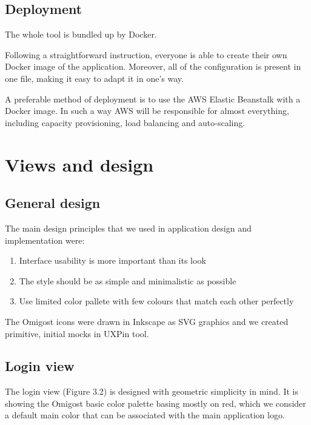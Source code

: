 \documentclass[licencjacka,en]{thesisclass}
\begin{document}
    \subsection{Deployment}

    The whole tool is bundled up by Docker.

    Following a straightforward instruction, everyone is able
    to create their own Docker image of the application.
    Moreover, all of the configuration is present in one file,
    making it easy to adapt it in one's way.

    A preferable method of deployment is to use the AWS Elastic Beanstalk with a Docker image.
    In such a way AWS will be responsible for almost everything,
    including capacity provisioning, load balancing and auto-scaling.

    \section{Views and design}
    
    \subsection{General design}
    
    The main design principles that we used in application design and implementation were:
    \begin{enumerate}
        \item Interface usability is more important than its look
        \item The style should be as simple and minimalistic as possible
        \item Use limited color pallete with few colours that match each other perfectly        
    \end{enumerate}
    
    The Omigost icons were drawn in Inkscape as SVG graphics and we created primitive,
    initial mocks in UXPin \cite{UXPin} tool.
    
    \subsection{Login view}
    
  
    The login view (Figure 3.2) is designed with geometric simplicity in mind.
    It is showing the Omigost basic color palette basing mostly on red, which we consider
    a default main color that can be associated with the main application logo.
\end{document}

